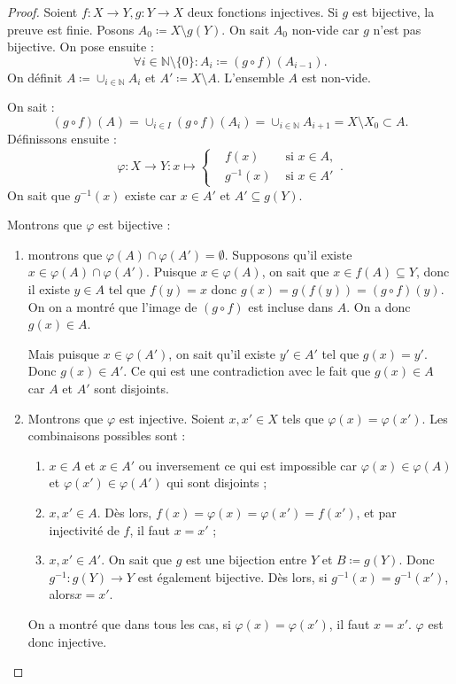 \documentclass{article}
\newcommand{\N}{\mathbb N}
\theoremstyle{definition}
\theoremstyle{remark}
\begin{document}
		\begin{proof} Soient $f : X \to Y, g : Y \to X$ deux fonctions injectives. Si $g$ est bijective, la preuve est finie. Posons $A_0 \coloneqq X \setminus g(Y)$.
		On sait $A_0$ non-vide car $g$ n'est pas bijective. On pose ensuite : \[\forall i \in \N \setminus \{0\} : A_i \coloneqq (g \circ f)(A_{i-1}).\]
		On définit $A \coloneqq \cup_{i\in\N}A_i$ et $A' \coloneqq X \setminus A$. L'ensemble $A$ est non-vide.

		On sait : \[(g \circ f)(A) = \cup_{i \in I}(g \circ f)(A_i) = \cup_{i\in\N}A_{i+1} = X \setminus X_0\subset A.\]
		Définissons ensuite : \[\varphi : X \to Y : x \mapsto \left\{\begin{aligned}&f(x) &\text{ si } x \in A, \\&g^{-1}(x) &\text{ si $x \in A'$}\end{aligned}\right..\]
		On sait que $g^{-1}(x)$ existe car $x \in A'$ et $A' \subseteq g(Y)$.

		Montrons que $\varphi$ est bijective :
		\begin{enumerate}
			\item montrons que $\varphi(A) \cap \varphi(A') = \emptyset$. Supposons qu'il existe $x \in \varphi(A) \cap \varphi(A')$. Puisque $x \in \varphi(A)$, on sait que
			$x \in f(A) \subseteq Y$, donc il existe $y \in A$ tel que $f(y) = x$ donc $g(x) = g(f(y)) = (g \circ f)(y)$. On on a montré que l'image de $(g \circ f)$ est incluse
			dans $A$. On a donc $g(x) \in A$.

			Mais puisque $x \in \varphi(A')$, on sait qu'il existe $y' \in A'$ tel que $g(x) = y'$. Donc $g(x) \in A'$. Ce qui est une contradiction avec le fait que $g(x) \in A$
			car $A$ et $A'$ sont disjoints.

			\item Montrons que $\varphi$ est injective. Soient $x, x' \in X$ tels que $\varphi(x) = \varphi(x')$. Les combinaisons possibles sont :
			\begin{enumerate}
				\item $x \in A$ et $x \in A'$ ou inversement ce qui est impossible car $\varphi(x) \in \varphi(A)$ et $\varphi(x') \in \varphi(A')$ qui sont disjoints ;
				\item $x, x' \in A$. Dès lors, $f(x) = \varphi(x) = \varphi(x') = f(x')$, et par injectivité de $f$, il faut $x=x'$ ;
				\item $x, x' \in A'$. On sait que $g$ est une bijection entre $Y$ et $B \coloneqq g(Y)$. Donc $g^{-1} : g(Y) \to Y$ est également bijective. Dès lors,
				si $g^{-1}(x) = g^{-1}(x')$, alors$x = x'$.
			\end{enumerate}
			On a montré que dans tous les cas, si $\varphi(x) = \varphi(x')$, il faut $x=x'$. $\varphi$ est donc injective.


\end{enumerate}
\end{proof}
\end{document}
